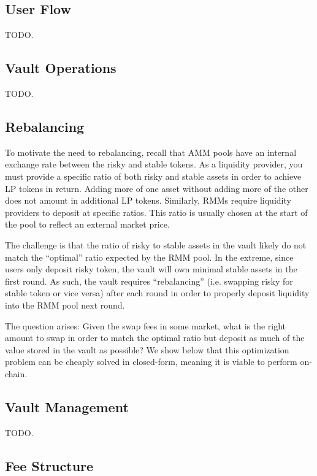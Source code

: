 \documentclass[hidelinks, 12pt]{article}
\begin{document}
\subsection{User Flow}

TODO.

\subsection{Vault Operations}

TODO.

\subsection{Rebalancing}

To motivate the need to rebalancing, recall that AMM pools have an internal exchange rate between the risky and stable tokens. As a liquidity provider, you must provide a specific ratio of both risky and stable assets in order to achieve LP tokens in return. Adding more of one asset without adding more of the other does not amount in additional LP tokens. Similarly, RMMs require liquidity providers to deposit at specific ratios. This ratio is usually chosen at the start of the pool to reflect an external market price.

The challenge is that the ratio of risky to stable assets in the vault likely do not match the ``optimal'' ratio expected by the RMM pool. In the extreme, since users only deposit risky token, the vault will own minimal stable assets in the first round. As such, the vault requires ``rebalancing'' (i.e. swapping risky for stable token or vice versa) after each round in order to properly deposit liquidity into the RMM pool next round.

The question arises: Given the swap fees in some market, what is the right amount to swap in order to match the optimal ratio but deposit as much of the value stored in the vault as possible? We show below that this optimization problem can be cheaply solved in closed-form, meaning it is viable to perform on-chain.

\subsection{Vault Management}

TODO.

\subsection{Fee Structure}
\end{document}
